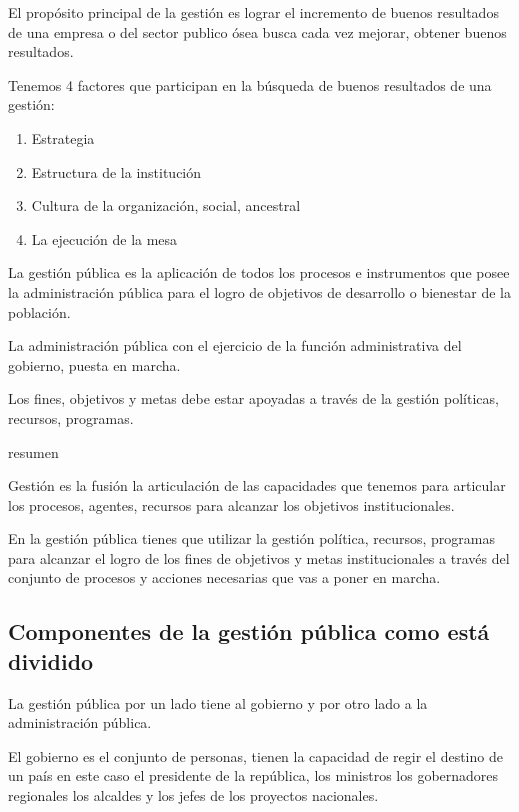 \documentclass[
  a4paper,
]{article}
\providecommand{\tightlist}{%
  \setlength{\itemsep}{0pt}\setlength{\parskip}{0pt}}\usepackage{longtable,booktabs,array}
\begin{document}
El propósito principal de la gestión es lograr el incremento de buenos
resultados de una empresa o del sector publico ósea busca cada vez
mejorar, obtener buenos resultados.

Tenemos 4 factores que participan en la búsqueda de buenos resultados de
una gestión:

\begin{enumerate}
\def\labelenumi{\arabic{enumi}.}
\tightlist
\item
  Estrategia
\item
  Estructura de la institución
\item
  Cultura de la organización, social, ancestral
\item
  La ejecución de la mesa
\end{enumerate}

La gestión pública es la aplicación de todos los procesos e instrumentos
que posee la administración pública para el logro de objetivos de
desarrollo o bienestar de la población.

La administración pública con el ejercicio de la función administrativa
del gobierno, puesta en marcha.

Los fines, objetivos y metas debe estar apoyadas a través de la gestión
políticas, recursos, programas.

resumen

Gestión es la fusión la articulación de las capacidades que tenemos para
articular los procesos, agentes, recursos para alcanzar los objetivos
institucionales.

En la gestión pública tienes que utilizar la gestión política, recursos,
programas para alcanzar el logro de los fines de objetivos y metas
institucionales a través del conjunto de procesos y acciones necesarias
que vas a poner en marcha.

\subsection{Componentes de la gestión pública como está
dividido}\label{componentes-de-la-gestiuxf3n-puxfablica-como-estuxe1-dividido}

La gestión pública por un lado tiene al gobierno y por otro lado a la
administración pública.

El gobierno es el conjunto de personas, tienen la capacidad de regir el
destino de un país en este caso el presidente de la república, los
ministros los gobernadores regionales los alcaldes y los jefes de los
proyectos nacionales.
\end{document}
